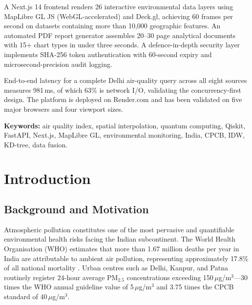 \documentclass[12pt,a4paper]{article}
\begin{document}
A Next.js 14 frontend renders 26 interactive environmental data layers using
MapLibre GL JS (WebGL-accelerated) and Deck.gl, achieving 60 frames per second
on datasets containing more than 10,000 geographic features. An automated PDF
report generator assembles 20--30 page analytical documents with 15+ chart
types in under three seconds. A defence-in-depth security layer implements
SHA-256 token authentication with 60-second expiry and microsecond-precision
audit logging.

End-to-end latency for a complete Delhi air-quality query across all eight
sources measures 981\,ms, of which 63\% is network I/O, validating the
concurrency-first design. The platform is deployed on Render.com and has
been validated on five major browsers and four viewport sizes.

\vspace{0.5em}
\noindent\textbf{Keywords:} air quality index, spatial interpolation, quantum
computing, Qiskit, FastAPI, Next.js, MapLibre GL, environmental monitoring,
India, CPCB, IDW, KD-tree, data fusion.

\clearpage

\tableofcontents
\clearpage

\listoffigures
\clearpage

\listoftables
\clearpage
\section{Introduction}
\label{sec:intro}

\subsection{Background and Motivation}
\label{sec:intro:background}

Atmospheric pollution constitutes one of the most pervasive and quantifiable
environmental health risks facing the Indian subcontinent. The World Health
Organisation (WHO) estimates that more than 1.67 million deaths per year in
India are attributable to ambient air pollution, representing approximately
17.8\% of all national mortality \cite{who2021}. Urban centres such as Delhi,
Kanpur, and Patna routinely register 24-hour average $\text{PM}_{2.5}$
concentrations exceeding 150\,$\mu$g/m$^{3}$---30 times the WHO annual
guideline value of 5\,$\mu$g/m$^{3}$ and 3.75 times the CPCB standard of
40\,$\mu$g/m$^{3}$.
\end{document}
